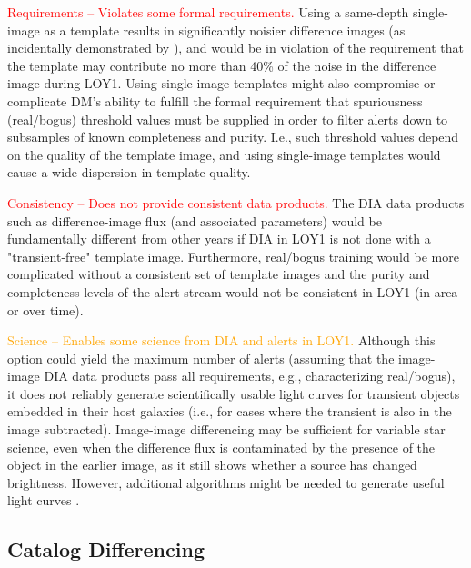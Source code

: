 \documentclass[DM,lsstdraft,toc]{lsstdoc}
\begin{document}
\textcolor{red}{ Requirements -- Violates some formal requirements.} Using a same-depth single-image as a template results in significantly noisier difference images (as incidentally demonstrated by ), and would be in violation of the requirement that the template may contribute no more than 40\% of the noise in the difference image during LOY1. Using single-image templates might also compromise or complicate DM's ability to fulfill the formal requirement that spuriousness (real/bogus) threshold values must be supplied in order to filter alerts down to subsamples of known completeness and purity. I.e., such threshold values depend on the quality of the template image, and using single-image templates would cause a wide dispersion in template quality.

\textcolor{red}{ Consistency -- Does not provide consistent data products.} The DIA data products such as difference-image flux (and associated parameters) would be fundamentally different from other years if DIA in LOY1 is not done with a "transient-free" template image. Furthermore, real/bogus training would be more complicated without a consistent set of template images and the purity and completeness levels of the alert stream would not be consistent in LOY1 (in area or over time).

\textcolor{orange}{ Science -- Enables some science from DIA and alerts in LOY1.} Although this option could yield the maximum number of alerts (assuming that the image-image DIA data products pass all requirements, e.g., characterizing real/bogus), it does not reliably generate scientifically usable light curves for transient objects embedded in their host galaxies (i.e., for cases where the transient is also in the image subtracted). Image-image differencing may be sufficient for variable star science, even when the difference flux is contaminated by the presence of the object in the earlier image, as it still shows whether a source has changed brightness. However, additional algorithms might be needed to generate useful light curves \citep[e.g.,][]{2005AJ....130.2272B}.


\clearpage
\subsection{Catalog Differencing}\label{ssec:potsol_catdiff}
\end{document}
